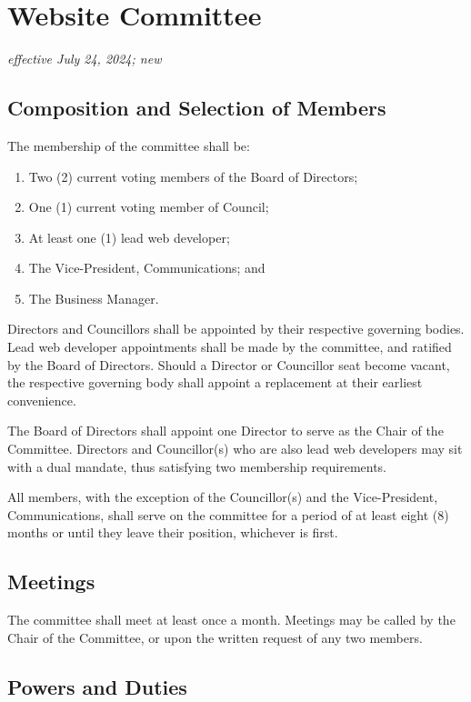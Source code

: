 \section{Website Committee}
\emph{effective July 24, 2024; new}\\

\subsection{Composition and Selection of Members}

The membership of the committee shall be:
\begin{enumerate}
	\item Two (2) current voting members of the Board of Directors;
	\item One (1) current voting member of Council;
	\item At least one (1) lead web developer;
	\item The Vice-President, Communications; and
	\item The Business Manager.
\end{enumerate}

Directors and Councillors shall be appointed by their respective governing bodies.
Lead web developer appointments shall be made by the committee, and ratified by the Board of Directors.
Should a Director or Councillor seat become vacant, the respective governing body shall appoint a replacement at their earliest convenience.

The Board of Directors shall appoint one Director to serve as the Chair of the Committee.
Directors and Councillor(s) who are also lead web developers may sit with a dual mandate, thus satisfying two membership requirements.

All members, with the exception of the Councillor(s) and the Vice-President, Communications, shall serve on the committee for a period of at least eight (8) months or until they leave their position, whichever is first.

\subsection{Meetings}

The committee shall meet at least once a month.
Meetings may be called by the Chair of the Committee, or upon the written request of any two members.

\subsection{Powers and Duties}


